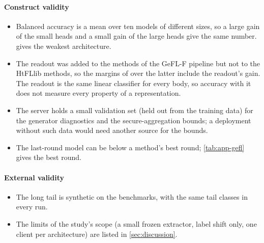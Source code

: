 \paragraph{Construct validity}
\begin{itemize}
\item Balanced accuracy is a mean over ten models of different sizes, so a large gain of the small heads and a small
gain of the large heads give the same number.  gives the weakest architecture.
\item The readout was added to the methods of the GeFL-F pipeline but not to the HtFLlib methods, so the margins of
\ours over the latter include the readout's gain. The readout is the same linear classifier for every body, so
accuracy with it does not measure every property of a representation.
\item The server holds a small validation set (held out from the training data) for the generator diagnostics and
the secure-aggregation bounds; a deployment without such data would need another source for the bounds.
\item The last-round model can be below a method's best round; \cref{tab:app-gefl} gives the best round.
\end{itemize}

\paragraph{External validity}
\begin{itemize}
\item The long tail is synthetic on the benchmarks, with the same tail classes in every run.
\item The limits of the study's scope (a small frozen extractor, label shift only, one client per architecture) are
listed in \cref{sec:discussion}.
\end{itemize}
